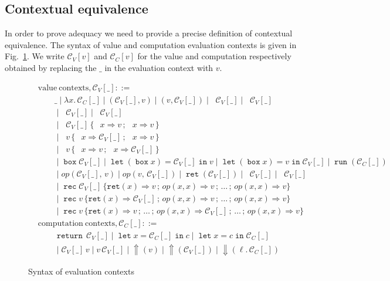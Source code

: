 \documentclass[acmsmall, screen, review, anonymous]{acmart}
\theoremstyle{definition}
\newcommand{\reflectname}{\mathord{\Uparrow}}
\newcommand{\performraw}[2]{\mathop{\reflectname(#1(#2))}}
\newcommand{\perform}[3]{\performraw{#1}{#2}(#3)}
\newcommand{\reifyname}{\Downarrow}
\newcommand{\reify}[2]{\mathop{\reifyname}(#1.\,#2)}
\newcommand{\loc}{\ell}
\newcommand{\outlname}{\mathtt{out}_L}
\newcommand{\outl}[1]{\mathop{\outlname} #1}
\newcommand{\outrname}{\mathtt{out}_R}
\newcommand{\outr}[1]{\mathop{\outrname} #1}
\newcommand{\indintro}[3]{{#1}(#2,\, #3)}
\newcommand{\retname}{\mathtt{ret}}
\newcommand{\ret}[1]{\mathop{\retname}(#1)}
\newcommand{\indelimname}{\mathtt{rec}}
\newcommand{\indelim}[2]{\mathop{\indelimname} #1 \,\{#2\}}
\newcommand{\indretcase}[2]{\retname(#1) \Rightarrow #2}
\newcommand{\indcase}[4]{#1(#2, #3) \Rightarrow #4}
\newcommand{\seq}{\,;\,}
\newcommand{\fstname}{\mathop{\pi_1}}
\newcommand{\fst}[1]{\fstname #1}
\newcommand{\sndname}{\mathop{\pi_2}}
\newcommand{\snd}[1]{\sndname #1}
\newcommand{\inlname}{\mathop{\mathtt{in}_L}}
\newcommand{\inl}[1]{\inlname #1}
\newcommand{\inrname}{\mathop{\mathtt{in}_R}}
\newcommand{\inr}[1]{\inrname #1}
\newcommand{\casename}{\mathtt{case}}
\newcommand{\casemname}{\casename^{m}}
\newcommand{\casem}[5]{\mathop{\casemname} #1 \,\{\,\inl{#2} \Rightarrow #3 \seq \inr{#4} \Rightarrow #5 \,\}}
\newcommand{\abs}[2]{\lambda#1.\,#2}
\newcommand{\app}[2]{#1\,#2}
\newcommand{\returnname}{\mathop{\mathtt{return}}}
\newcommand{\return}[1]{\returnname\, #1}
\newcommand{\letvname}{\mathop{\mathtt{let}}}
\newcommand{\letv}[3]{\letvname #1 = #2 \mathop{\mathtt{in}} #3}
\newcommand{\gboxname}{\mathop{\mathtt{box}}}
\newcommand{\gbox}[1]{\gboxname #1}
\newcommand{\gunbox}[3]{\mathop{\mathtt{let}} (\gbox{#1}) = #2 \mathop{\mathtt{in}} #3}
\newcommand{\grunname}{\mathtt{run}}
\newcommand{\grun}[1]{\mathop{\grunname}(#1)}
\newcommand{\ctxv}[1]{\mathcal{C}_V[#1]}
\newcommand{\ctxc}[1]{\mathcal{C}_C[#1]}
\begin{document}
\subsection{Contextual equivalence}

In order to prove adequacy we need to provide a precise definition of
contextual equivalence. The syntax of value and computation evaluation
contexts is given in Fig.~\ref{fig:execution-context}. We write
$\ctxv{v}$ and $\ctxc{v}$ for the value and computation respectively
obtained by replacing the $\_$ in the evaluation context with $v$.
\begin{figure}
\begin{align*}
  &\mathrm{value\ contexts}, \ctxv{\_} ::= \\
      &\qquad \_ \mid \abs{x}{\ctxc{\_}}
      \mid (\ctxv{\_}, v) \mid (v, \ctxv{\_})
      \mid \fst{\ctxv{\_}} \mid \snd{\ctxv{\_}} \\
    &\qquad \mid \inl{\ctxv{\_}} \mid \inr{\ctxv{\_}} \\
    &\qquad \mid \casem{\ctxv{\_}}{x}{v}{x}{v} \\
    &\qquad \mid \casem{v}{x}{\ctxv{\_}}{x}{v} \\
    &\qquad \mid \casem{v}{x}{v}{x}{\ctxv{\_}} \\
    &\qquad \mid \gbox{\ctxv{\_}}
      \mid \gunbox{x}{\ctxv{\_}}{v} \mid \gunbox{x}{v}{\ctxv{\_}}
      \mid \grun{\ctxc{\_}} \\
    &\qquad \mid \indintro{op}{\ctxv{\_}}{v} \mid \indintro{op}{v}{\ctxv{\_}}
      \mid \ret{\ctxv{\_}}
      \mid \outl{\ctxv{\_}} \mid \outr{\ctxv{\_}} \\
    &\qquad \mid \indelim{\ctxv{\_}}
             {\indretcase{x}{v} \seq
              \indcase{op}{x}{x}{v} \seq \ldots \seq
              \indcase{op}{x}{x}{v}} \\
    &\qquad \mid \indelim{v}
             {\indretcase{x}{\ctxv{\_}} \seq
              \indcase{op}{x}{x}{v} \seq \ldots \seq
              \indcase{op}{x}{x}{v}} \\
    &\qquad \mid \indelim{v}
             {\indretcase{x}{v} \seq \ldots \seq
              \indcase{op}{x}{x}{\ctxv{\_}} \seq \ldots \seq
              \indcase{op}{x}{x}{v}} \\[1em]
  &\mathrm{computation\ contexts}, \ctxc{\_} ::= \\
    &\qquad \return{\ctxv{\_}}
      \mid \letv{x}{\ctxc{\_}}{c} \mid \letv{x}{c}{\ctxc{\_}} \\
    &\qquad \mid \app{\ctxv{\_}}{v} \mid \app{v}{\ctxv{\_}}
      \mid \perform{\ctxv{\_}}{op}{v} \mid \perform{v}{op}{\ctxv{\_}}
      \mid \reify{\loc}{\ctxc{\_}}
\end{align*}
\caption{Syntax of evaluation contexts}
\label{fig:execution-context}
\end{figure}
\end{document}
